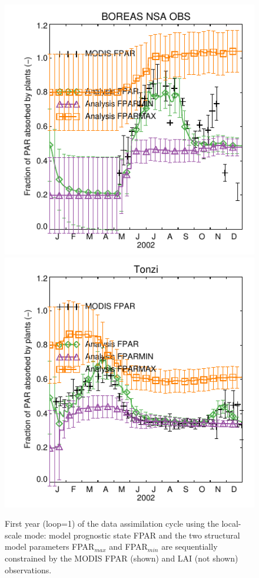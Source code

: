 \documentclass[a4paper,12pt]{article}
\begin{document}
\begin{figure}[hp]
\begin{center}
\includegraphics[scale=1.0]{BOREAS_NSA_OBS.dayplot.2002.FPAR.MODIS.pdf}
\includegraphics[scale=1.0]{Tonzi.dayplot.2002.FPAR.MODIS.pdf}
\caption{First year (loop=1) of the data assimilation cycle using the local-scale mode: model prognostic state FPAR and the two structural model parameters FPAR$_{max}$ and FPAR$_{min}$ are sequentially constrained by the MODIS FPAR (shown) and LAI (not shown) observations.}
\label{figure: local 1}
\end{center}
\end{figure}
\end{document}

